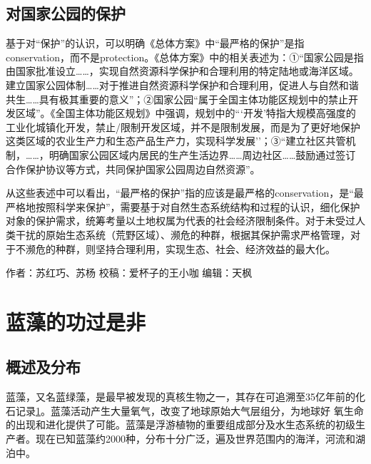 \documentclass[]{book}
\begin{document}
\hypertarget{ux5bf9ux56fdux5bb6ux516cux56edux7684ux4fddux62a4}{%
\subsection{对国家公园的保护}\label{ux5bf9ux56fdux5bb6ux516cux56edux7684ux4fddux62a4}}

基于对``保护''的认识，可以明确《总体方案》中``最严格的保护''是指conservation，而不是protection。《总体方案》中的相关表述为：①``国家公园是指由国家批准设立\ldots{}\ldots{}，实现自然资源科学保护和合理利用的特定陆地或海洋区域。建立国家公园体制\ldots{}\ldots{}对于推进自然资源科学保护和合理利用，促进人与自然和谐共生\ldots{}\ldots{}具有极其重要的意义''；②国家公园``属于全国主体功能区规划中的禁止开发区域''。《全国主体功能区规划》中强调，规划中的```开发'特指大规模高强度的工业化城镇化开发，禁止/限制开发区域，并不是限制发展，而是为了更好地保护这类区域的农业生产力和生态产品生产力，实现科学发展''；③``建立社区共管机制，\ldots{}\ldots{}，明确国家公园区域内居民的生产生活边界\ldots{}\ldots{}周边社区\ldots{}\ldots{}鼓励通过签订合作保护协议等方式，共同保护国家公园周边自然资源''。

从这些表述中可以看出，``最严格的保护''指的应该是最严格的conservation，是``最严格地按照科学来保护''，需要基于对自然生态系统结构和过程的认识，细化保护对象的保护需求，统筹考量以土地权属为代表的社会经济限制条件。对于未受过人类干扰的原始生态系统（荒野区域）、濒危的种群，根据其保护需求严格管理，对于不濒危的种群，则坚持合理利用，实现生态、社会、经济效益的最大化。

作者：苏红巧、苏杨
校稿：爱杯子的王小咖
编辑：天枫

\hypertarget{ux84ddux85fbux7684ux529fux8fc7ux662fux975e}{%
\section{蓝藻的功过是非}\label{ux84ddux85fbux7684ux529fux8fc7ux662fux975e}}

\hypertarget{ux6982ux8ff0ux53caux5206ux5e03}{%
\subsection{概述及分布}\label{ux6982ux8ff0ux53caux5206ux5e03}}

蓝藻，又名蓝绿藻，是最早被发现的真核生物之一，其存在可追溯至35亿年前的化石记录\href{陈心想，耿增超。西北农林科技大学学报（自然科学版），2013，41:\%20167-174．}{1}。蓝藻活动产生大量氧气，改变了地球原始大气层组分，为地球好 氧生命的出现和进化提供了可能。蓝藻是浮游植物的重要组成部分及水生态系统的初级生产者。现在已知蓝藻约2000种，分布十分广泛，遍及世界范围内的海洋，河流和湖泊中。
\end{document}

